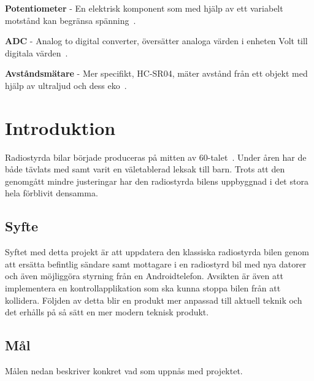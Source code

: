 \documentclass[a4paper]{article}
\begin{document}
\vspace{5mm} \noindent
{\bf Potentiometer} - En elektrisk komponent som med hjälp av ett variabelt motstånd kan begränsa spänning~\cite{Potentiometer}.

\vspace{5mm} \noindent
{\bf ADC} - Analog to digital converter, översätter analoga värden i enheten Volt till digitala värden~\cite{ADC}.

\vspace{5mm} \noindent
{\bf Avståndsmätare} - Mer specifikt, HC-SR04, mäter avstånd från ett objekt med hjälp av ultraljud och dess eko~\cite{DistMeasure}.






\newpage
\section{Introduktion}

Radiostyrda bilar började produceras på mitten av 60-talet~\cite{RCHistory}. Under åren har de både tävlats med samt varit en väletablerad leksak till barn. Trots att den genomgått mindre justeringar har den radiostyrda bilens uppbyggnad i det stora hela förblivit densamma.

\subsection{Syfte}

Syftet med detta projekt är att uppdatera den klassiska radiostyrda bilen genom att ersätta befintlig sändare samt mottagare i en radiostyrd bil med nya datorer och även möjliggöra styrning från en Androidtelefon. Avsikten är även att implementera en kontrollapplikation som ska kunna stoppa bilen från att kollidera. Följden av detta blir en produkt mer anpassad till aktuell teknik och det erhålls på så sätt en mer modern teknisk produkt.



\subsection{Mål}
Målen nedan beskriver konkret vad som uppnås med projektet.
\end{document}
